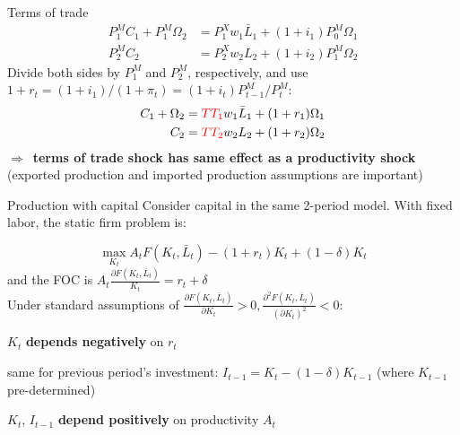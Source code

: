 \documentclass{beamer}
\newenvironment{mynumerate}
{\vfill\enumerate[nolistsep,itemsep=\fill,label=\arabic*.]}
  {\endenumerate}
\newcommand{\rarr}{$\Rightarrow$\ }
\begin{document}
\begin{frame}{Terms of trade}
\begin{align*}
     P^M_1 C_1 + P_1^M \Omega_2  &= P^X_1 w_1 \bar L_1 + (1+i_1) P_0^M \Omega_1  \\
     P^M_2 C_2 & =  P^X_2 w_2 L_2  + (1+i_2) P_1^M \Omega_2
  \end{align*} 
  Divide both sides by \(P_1^M\) and \(P_2^M\),
respectively, and use
\(1+r_t = (1+i_1)/(1+\pi_t) = (1+i_t)P^M_{t-1}/P^M_t\): \begin{align*}
     C_1 + \Omega_2  &= \textcolor{red}{TT_1} w_1 \bar L_1 + (1+r_1) \Omega_1  \\
     C_2 & =  \textcolor{red}{TT_2} w_2 L_2  + (1+r_2) \Omega_2
  \end{align*} \rarr \textbf{terms of trade shock has same effect as a
  productivity shock} (exported production and imported production assumptions are important)
\end{frame}

\begin{frame}{Production with capital}
  Consider capital in the same 2-period model.
  With fixed labor, the static firm problem is:

  $$\max_{K_t} A_t F(K_t, \bar L_t) - (1+r_{t})K_t + (1-\delta)K_t $$
  and the FOC is $A_t \frac{\partial F(K_t, \bar L_t)}{K_t} =  r_t + \delta$ \\
\vfill 
Under standard assumptions of $\frac{\partial F(K_t, \bar L_t)}{\partial K_t} >0, \frac{\partial^2 F(K_t, \bar L_t)}{(\partial K_t)^2}<0$: 

\begin{mynumerate}
\item  $K_t$ \textbf{depends negatively} on $r_t$ 
\item same for previous period's investment: $I_{t-1} = K_{t} - (1-\delta)K_{t-1}$ (where $K_{t-1}$ pre-determined)
\item $K_t$, $I_{t-1}$ \textbf{depend positively} on productivity $A_t$
\end{mynumerate}


\end{frame}
\end{document}
